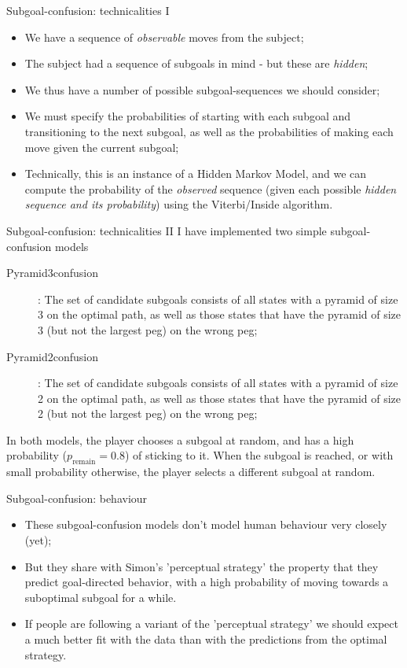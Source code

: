 \documentclass[xcolor=table]{beamer}
\begin{document}
\begin{frame}{Subgoal-confusion: technicalities I}
  \begin{itemize}[<+->]
  \item We have a sequence of \emph{observable} moves from the subject;
  \item The subject had a sequence of subgoals in mind - but these are \emph{hidden};
  \item We thus have a number of possible subgoal-sequences we should consider;
  \item We must specify the probabilities of starting with each subgoal and transitioning to the next subgoal, as well as the probabilities of making each move given the current subgoal;
  \item Technically, this is an instance of a Hidden Markov Model, and we can compute the probability of the \emph{observed} sequence (given each possible \emph{hidden sequence and its probability}) using the Viterbi/Inside algorithm.
  \end{itemize}
\end{frame}

\begin{frame}{Subgoal-confusion: technicalities II}
I have implemented two simple subgoal-confusion models
  \begin{description}
  \item[Pyramid3confusion]: The set of candidate subgoals consists of all states with a pyramid of size 3 on the optimal path, as well as those states that have the pyramid of size 3 (but not the largest peg) on the wrong peg;
\pause
  \item[Pyramid2confusion]: The set of candidate subgoals consists of all states with a pyramid of size 2 on the optimal path, as well as those states that have the pyramid of size 2 (but not the largest peg) on the wrong peg;
  \end{description}

\pause
In both models, the player chooses a subgoal at random, and has a high probability ($p_{\mbox{remain}}=0.8$) of sticking to it. When the subgoal is reached, or with small probability otherwise, the player selects a different subgoal at random.
\end{frame}

\begin{frame}{Subgoal-confusion: behaviour}
  \begin{itemize}[<+->]
  \item These subgoal-confusion models don't model human behaviour very closely (yet);
  \item But they share with Simon's 'perceptual strategy' the property that they predict goal-directed behavior, with a high probability of moving towards a suboptimal subgoal for a while.
  \item If people are following a variant of the 'perceptual strategy' we should expect a much better fit with the data than with the predictions from the optimal strategy.
  \end{itemize}
\end{frame}
\end{document}

